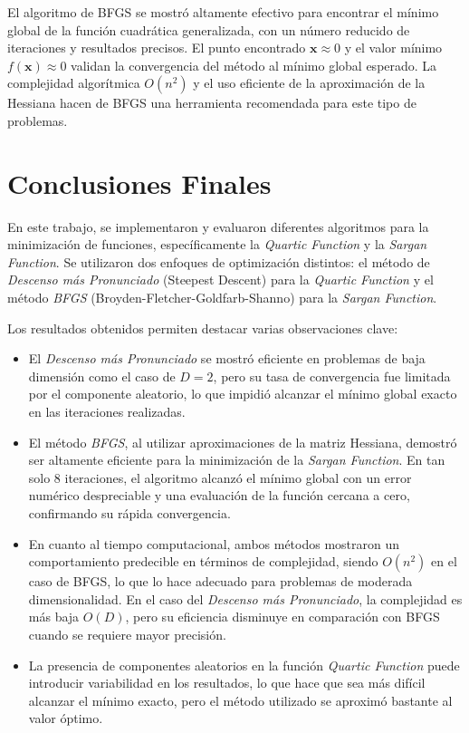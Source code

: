 \documentclass{article}
\begin{document}
	El algoritmo de BFGS se mostró altamente efectivo para encontrar el mínimo global de la función cuadrática generalizada, con un número reducido de iteraciones y resultados precisos. El punto encontrado \(\mathbf{x} \approx 0\) y el valor mínimo \(f(\mathbf{x}) \approx 0\) validan la convergencia del método al mínimo global esperado. La complejidad algorítmica \(O(n^2)\) y el uso eficiente de la aproximación de la Hessiana hacen de BFGS una herramienta recomendada para este tipo de problemas.
	
	\section{Conclusiones Finales}
	
	En este trabajo, se implementaron y evaluaron diferentes algoritmos para la minimización de funciones, específicamente la \textit{Quartic Function} y la \textit{Sargan Function}. Se utilizaron dos enfoques de optimización distintos: el método de \textit{Descenso más Pronunciado} (Steepest Descent) para la \textit{Quartic Function} y el método \textit{BFGS} (Broyden-Fletcher-Goldfarb-Shanno) para la \textit{Sargan Function}.
	
	Los resultados obtenidos permiten destacar varias observaciones clave:
	
	\begin{itemize}
		\item El \textit{Descenso más Pronunciado} se mostró eficiente en problemas de baja dimensión como el caso de \(D=2\), pero su tasa de convergencia fue limitada por el componente aleatorio, lo que impidió alcanzar el mínimo global exacto en las iteraciones realizadas.
		\item El método \textit{BFGS}, al utilizar aproximaciones de la matriz Hessiana, demostró ser altamente eficiente para la minimización de la \textit{Sargan Function}. En tan solo 8 iteraciones, el algoritmo alcanzó el mínimo global con un error numérico despreciable y una evaluación de la función cercana a cero, confirmando su rápida convergencia.
		\item En cuanto al tiempo computacional, ambos métodos mostraron un comportamiento predecible en términos de complejidad, siendo \(O(n^2)\) en el caso de BFGS, lo que lo hace adecuado para problemas de moderada dimensionalidad. En el caso del \textit{Descenso más Pronunciado}, la complejidad es más baja \(O(D)\), pero su eficiencia disminuye en comparación con BFGS cuando se requiere mayor precisión.
		\item La presencia de componentes aleatorios en la función \textit{Quartic Function} puede introducir variabilidad en los resultados, lo que hace que sea más difícil alcanzar el mínimo exacto, pero el método utilizado se aproximó bastante al valor óptimo.
	\end{itemize}
	
\end{document}
